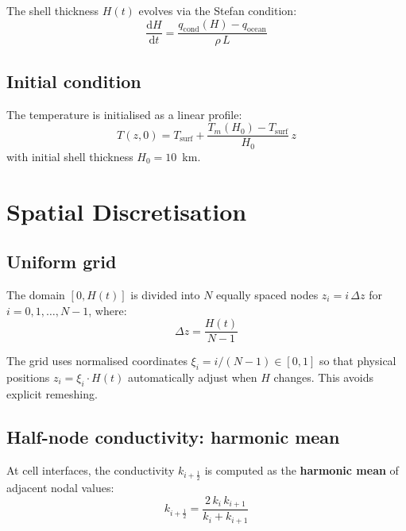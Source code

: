 \documentclass[11pt,a4paper]{article}
\newcommand{\dd}{\mathrm{d}}
\newcommand{\half}{\tfrac{1}{2}}
\begin{document}
The shell thickness $H(t)$ evolves via the Stefan condition:
\begin{equation}
\frac{\dd H}{\dd t} = \frac{q_{\mathrm{cond}}(H) - q_{\mathrm{ocean}}}{\rho\,L}
\label{eq:stefan}
\end{equation}

\subsection{Initial condition}

The temperature is initialised as a linear profile:
\begin{equation}
T(z, 0) = T_{\mathrm{surf}} + \frac{T_m(H_0) - T_{\mathrm{surf}}}{H_0}\,z
\end{equation}
with initial shell thickness $H_0 = 10$~km.

\section{Spatial Discretisation}
\label{sec:spatial}

\subsection{Uniform grid}

The domain $[0, H(t)]$ is divided into $N$ equally spaced nodes
$z_i = i\,\Delta z$ for $i = 0, 1, \ldots, N{-}1$, where:
\begin{equation}
\Delta z = \frac{H(t)}{N - 1}
\end{equation}

The grid uses normalised coordinates $\xi_i = i/(N{-}1) \in [0,1]$
so that physical positions $z_i = \xi_i \cdot H(t)$ automatically
adjust when $H$ changes. This avoids explicit remeshing.

\subsection{Half-node conductivity: harmonic mean}

At cell interfaces, the conductivity $k_{i+\half}$ is computed as the
\textbf{harmonic mean} of adjacent nodal values:
\begin{equation}
k_{i+\half} = \frac{2\,k_i\,k_{i+1}}{k_i + k_{i+1}}
\label{eq:harmonic}
\end{equation}
\end{document}
